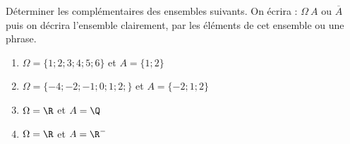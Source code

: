 
Déterminer les complémentaires des ensembles suivants. On écrira : $\Omega \ A$ ou $\overline{A}$ puis on décrira l'ensemble clairement, par les éléments de cet ensemble ou une phrase.
\begin{enumerate}
\item $\Omega = \lbrace 1;2;3;4;5;6\rbrace$ et $A = \lbrace 1;2 \rbrace$
\item $\Omega = \lbrace -4;-2;-1;0;1;2;\rbrace$ et $A = \lbrace -2;1;2 \rbrace$
\item $\Omega = \R$ et $A = \Q$
\item $\Omega = \R$ et $A = \R^-$
\end{enumerate}